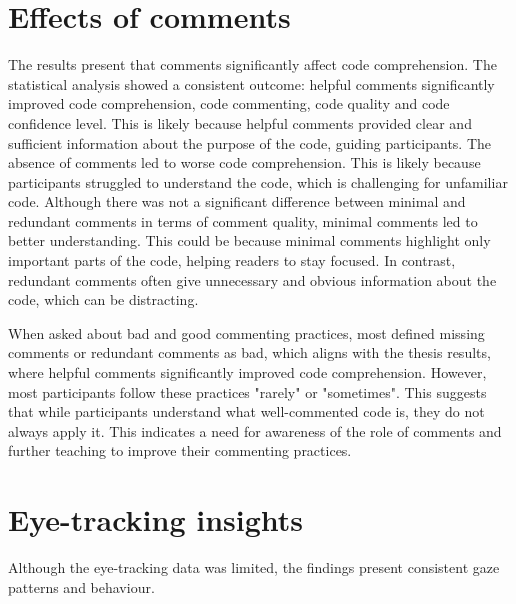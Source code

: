 \section{Effects of comments} 
The results present that comments significantly affect code comprehension. The statistical analysis showed a consistent outcome: helpful comments significantly improved code comprehension, code commenting, code quality and code confidence level. This is likely because helpful comments provided clear and sufficient information about the purpose of the code, guiding participants. The absence of comments led to worse code comprehension. This is likely because participants struggled to understand the code, which is challenging for unfamiliar code. Although there was not a significant difference between minimal and redundant comments in terms of comment quality, minimal comments led to better understanding. This could be because minimal comments highlight only important parts of the code, helping readers to stay focused. In contrast, redundant comments often give unnecessary and obvious information about the code, which can be distracting.


When asked about bad and good commenting practices, most defined missing comments or redundant comments as bad, which aligns with the thesis results, where helpful comments significantly improved code comprehension. However, most participants follow these practices "rarely" or "sometimes". This suggests that while participants understand what well-commented code is, they do not always apply it. This indicates a need for awareness of the role of comments and further teaching to improve their commenting practices.  



\section{Eye-tracking insights} 
Although the eye-tracking data was limited, the findings present consistent gaze patterns and behaviour. 

